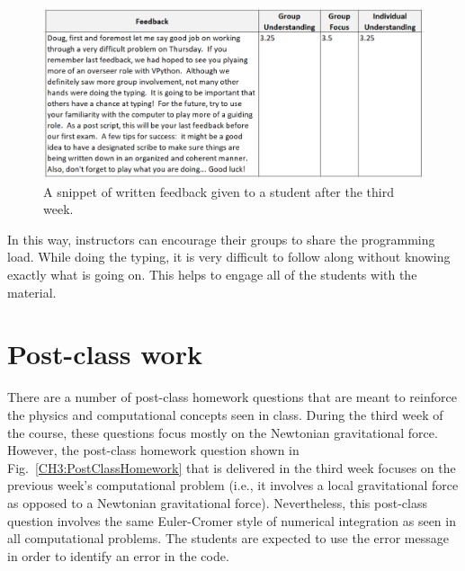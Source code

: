 \documentclass{msuphddissertation}
\begin{document}
\begin{doublespace}
\begin{figure}[ht]\centering
\includegraphics[scale=0.5]{images/CH3WrittenFeedback.pdf}
\caption{A snippet of written feedback given to a student after the third week.}\label{CH3:WrittenFeedback}
\end{figure}

In this way, instructors can encourage their groups to share the programming load.  While doing the typing, it is very difficult to follow along without knowing exactly what is going on.  This helps to engage all of the students with the material.

\section{Post-class work}

There are a number of post-class homework questions that are meant to reinforce the physics and computational concepts seen in class.  During the third week of the course, these questions focus mostly on the Newtonian gravitational force.  However, the post-class homework question shown in Fig.~\ref{CH3:PostClassHomework} that is delivered in the third week focuses on the previous week's computational problem (i.e., it involves a local gravitational force as opposed to a Newtonian gravitational force).  Nevertheless, this post-class question involves the same Euler-Cromer style of numerical integration as seen in all computational problems.  The students are expected to use the error message in order to identify an error in the code.


\end{doublespace}
\end{document}
